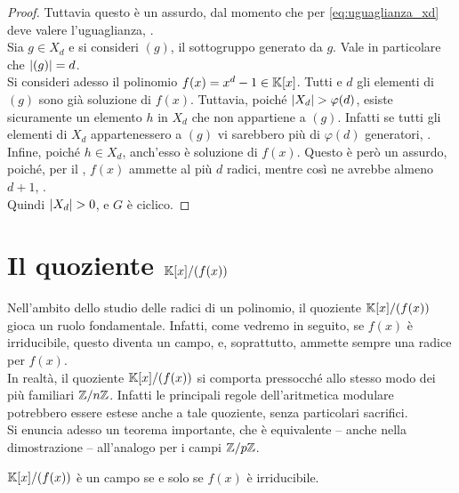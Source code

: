 \documentclass[11pt]{scrbook}
\begin{document}
\begin{proof}
    \vskip 0.1in

    Tuttavia questo è un assurdo, dal momento che per \eqref{eq:uguaglianza_xd}
    deve valere l'uguaglianza, \Lightning{}. \\

    Sia $g \in X_d$ e si consideri $(g)$, il sottogruppo generato da $g$.
    Vale in particolare che $\left|(g)\right| = d$. \\

    Si consideri adesso il polinomio $f(x)= x^d-1 \in \mathbb{K}[x]$. Tutti e $d$ gli
    elementi di $(g)$ sono già soluzione di $f(x)$. Tuttavia, poiché
    $\left|X_d\right| > \varphi(d)$, esiste sicuramente un elemento $h$ in $X_d$ che
    non appartiene a $(g)$. Infatti se tutti gli elementi di $X_d$ appartenessero
    a $(g)$ vi sarebbero più di $\varphi(d)$ generatori, \Lightning{}. \\

    Infine, poiché $h \in X_d$, anch'esso è soluzione di $f(x)$. Questo è
    però un assurdo, poiché, per il , $f(x)$
    ammette al più $d$ radici, mentre così ne avrebbe almeno $d+1$, \Lightning{}. \\

    Quindi $\card{X_d}>0$, e $G$ è ciclico.
\end{proof}

\section{Il quoziente \texorpdfstring{$\mathbb{K}[x]/(f(x))$}{K[x]/(f(x))}}

Nell'ambito dello studio delle radici di un polinomio,
il quoziente $\mathbb{K}[x]/(f(x))$ gioca un ruolo fondamentale.
Infatti, come vedremo in seguito, se $f(x)$ è irriducibile,
questo diventa un campo, e, soprattutto, ammette sempre una
radice per $f(x)$. \\

In realtà, il quoziente $\mathbb{K}[x]/(f(x))$ si comporta pressocché
allo stesso modo dei più familiari $\mathbb Z/n\mathbb Z$. Infatti
le principali regole dell'aritmetica modulare potrebbero
essere estese anche a tale quoziente, senza particolari
sacrifici. \\

Si enuncia adesso un teorema importante, che è equivalente --
anche nella dimostrazione -- all'analogo per i campi
$\mathbb Z/p\mathbb Z$.

\begin{theorem}
    \label{th:campo_quoziente_irriducibile}
    $\mathbb{K}[x]/(f(x))$ è un campo se e solo se $f(x)$ è irriducibile.
\end{theorem}
\end{document}
